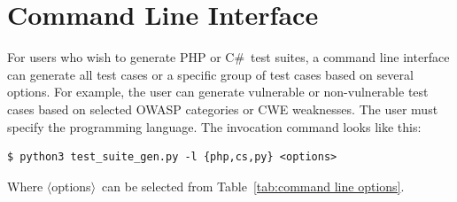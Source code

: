 \documentclass[12pt]{article}
\newcommand{\CSharp}{C{\fontseries{b}\selectfont\#}}
\begin{document}
\section{Command Line Interface}
\label{sec:command line interface}

For users who wish to generate PHP or \CSharp\ test suites, a command line interface
can generate all test cases or a specific group of test cases based on several
options.  For example, the user can generate vulnerable or non-vulnerable test cases
based on selected OWASP categories or CWE weaknesses.  The user must specify the
programming language.  The invocation command looks like this:
\begin{verbatim}
$ python3 test_suite_gen.py -l {php,cs,py} <options>
\end{verbatim}

\newcommand{\texlangle}{$\langle$}
\newcommand{\texrangle}{$\rangle$}
Where \texlangle options\texrangle\ can be selected from 
Table~\ref{tab:command line options}.
\end{document}
